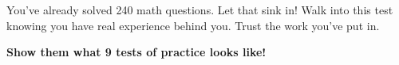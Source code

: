 {\begin{tcolorbox}[
    enhanced,
    colback=funYellowLight,
    colframe=funYellow!60,
    arc=10pt,
    boxrule=1pt,
    left=6mm, right=6mm, top=4mm, bottom=4mm,
]
\vspace{2mm}

You've already solved 240 math questions. Let that sink in! Walk into this test knowing you have real experience behind you. Trust the work you've put in.
\end{tcolorbox}

\vspace{4mm}

\begin{center}
{\large\bfseries\color{funBlueDark} \faRocket\hspace{2mm}Show them what 9 tests of practice looks like!\hspace{2mm}\faRocket}
\end{center}

}
\newpage
